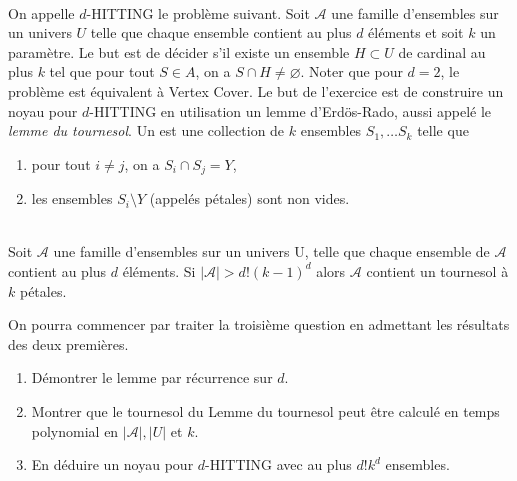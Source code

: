\begin{td-exo}\,\\
    On appelle \(d\)-HITTING le probl\`eme suivant.
    Soit \(\mathcal{A}\) une famille d'ensembles sur un univers \(U\) telle que chaque ensemble contient au plus \(d\) \'el\'ements et soit \(k\) un param\`etre.
    Le but est de d\'ecider s'il existe un ensemble \(H \subset U\) de cardinal au plus \(k\) tel que pour tout \(S\in A\), on a \(S\cap H \neq \varnothing\).
    Noter que pour \(d=2\), le probl\`eme est \'equivalent \`a Vertex Cover.
    Le but de l'exercice est de construire un noyau pour \(d\)-HITTING en utilisation un lemme d'Erd\"os-Rado, aussi appel\'e le \emph{lemme du tournesol}.
    Un  est une collection de \(k\) ensembles \(S_1,\ldots S_k\) telle que
    \begin{enumerate}[label=\roman*)]
        \item pour tout \(i\neq j\), on a \(S_i \cap S_j = Y\),
        \item les ensembles \(S_i \setminus Y\) (appel\'es p\'etales) sont non vides.
    \end{enumerate}

    \begin{lemma}[du tournesol]\,\\
        Soit \(\mathcal{A}\) une famille d'ensembles sur un univers U, telle que chaque ensemble de \(\mathcal A\) contient au plus \(d\) \'el\'ements.
        Si \(|\mathcal{A}| > d ! {(k-1)}^d\) alors \(\mathcal{A}\) contient un tournesol \`a \(k\) p\'etales.
    \end{lemma}\vspace{1mm}

    On pourra commencer par traiter la troisi\`eme question en admettant les r\'esultats des deux premi\`eres.

    \begin{enumerate}
        \item D\'emontrer le lemme par r\'ecurrence sur \(d\).

        \item Montrer que le tournesol du Lemme du tournesol peut \^etre calcul\'e en temps polynomial en \(|\mathcal{A}|, |U|\) et \(k\).

        \item En d\'eduire un noyau pour \(d\)-HITTING avec au plus \(d! k^d\) ensembles.
    \end{enumerate}
\end{td-exo}
